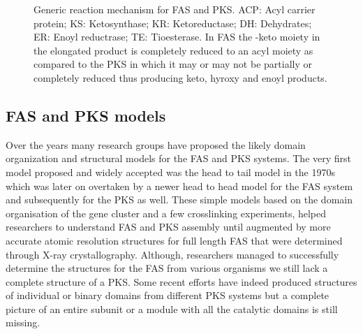 		\setlength\fboxsep{5pt}
		\setlength\fboxrule{1.5pt}
		\begin{figure} [htbp]
		\centering
		\caption[Generic reaction mechanism for FAS and PKS]{Generic reaction mechanism for FAS and PKS. ACP: Acyl carrier protein; KS: Ketosynthase; KR: Ketoreductase; DH: Dehydrates; ER: Enoyl reductrase; TE: Tioesterase. In FAS the \bet-keto moiety in the elongated product is completely reduced to an acyl moiety as compared to the PKS in which it may or may not be partially or completely reduced thus producing keto, hyroxy and enoyl products. }
		\label{fig:FASandPKS}
		\end{figure}
		
		\subsection{FAS and PKS models}
		\label{sec:FASmodels}
		Over the years many research groups have proposed the likely domain organization and structural models for the FAS and PKS systems. The very first model proposed and widely accepted was the head to tail model in the 1970s which was later on overtaken by a newer head to head model for the FAS system and subsequently for the PKS as well. These simple models based on the domain organisation of the gene cluster and a few crosslinking experiments, helped researchers to understand FAS and PKS assembly until augmented by more accurate atomic resolution structures for full length FAS that were determined through X-ray crystallography. Although, researchers managed to successfully determine the structures for the FAS from various organisms we still lack a complete structure of a PKS. Some recent efforts have indeed produced structures of individual or binary domains from different PKS systems but a complete picture of an entire subunit or a module with all the catalytic domains is still missing.
			
